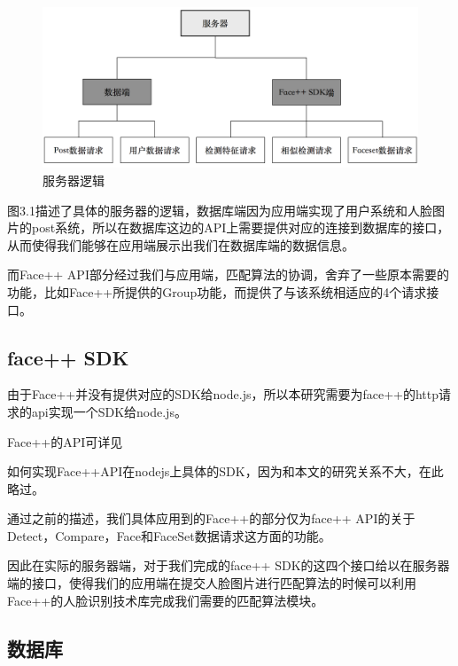 \begin{figure}[h]
\centering
\includegraphics[width=\textwidth]{img/chap3/server.png}
\caption{服务器逻辑\label{Face++API}}
\end{figure}
 
图3.1描述了具体的服务器的逻辑，数据库端因为应用端实现了用户系统和人脸图片的post系统，所以在数据库这边的API上需要提供对应的连接到数据库的接口，从而使得我们能够在应用端展示出我们在数据库端的数据信息。

而Face++ API部分经过我们与应用端，匹配算法的协调，舍弃了一些原本需要的功能，比如Face++所提供的Group功能，而提供了与该系统相适应的4个请求接口。


\subsection{face++ SDK}
由于Face++并没有提供对应的SDK给node.js，所以本研究需要为face++的http请求的api实现一个SDK给node.js。

Face++的API可详见\parencite{face}

如何实现Face++API在nodejs上具体的SDK，因为和本文的研究关系不大，在此略过。

通过之前的描述，我们具体应用到的Face++的部分仅为face++ API的关于Detect，Compare，Face和FaceSet数据请求这方面的功能。

因此在实际的服务器端，对于我们完成的face++ SDK的这四个接口给以在服务器端的接口，使得我们的应用端在提交人脸图片进行匹配算法的时候可以利用Face++的人脸识别技术库完成我们需要的匹配算法模块。


\subsection{数据库}

